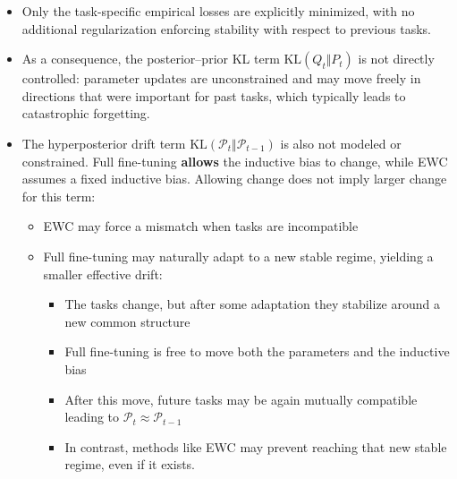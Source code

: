 \documentclass{article}
\theoremstyle{plain}
\theoremstyle{definition}
\theoremstyle{remark}
\begin{document}
\begin{itemize}
  \item Only the task-specific empirical losses are explicitly minimized, with no additional regularization enforcing stability with respect to previous tasks.
       \item As a consequence, the posterior--prior KL term $\mathrm{KL}(Q_t \Vert P_t)$ is not directly controlled: parameter updates are unconstrained and may move freely in directions that were important for past tasks, which typically leads to catastrophic forgetting.
        \item The hyperposterior drift term $\mathrm{KL}(\mathcal P_t \Vert \mathcal P_{t-1})$ is also not modeled or constrained. Full fine-tuning \textbf{allows} the inductive bias to change, while EWC assumes a fixed inductive bias. Allowing change does not imply larger change for this term:
        \begin{itemize}
            \item   EWC may force a mismatch when tasks are incompatible
            \item Full fine-tuning may naturally adapt to a new stable regime, yielding a smaller effective drift:
            \begin{itemize}
                \item The tasks change, but after some adaptation they stabilize around a new common structure
                \item Full fine-tuning is free to move both the parameters and the inductive bias
                \item After this move, future tasks may be again mutually compatible leading to $\mathcal{P}_t \approx \mathcal{P}_{t-1}$
                \item In contrast, methods like EWC may prevent reaching that new stable regime, even if it exists. 
            \end{itemize}
        \end{itemize}
         
       
     
\end{itemize}
\end{document}
